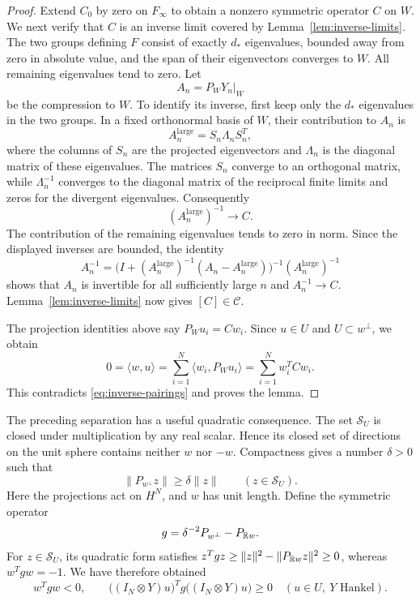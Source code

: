 \begin{proof}
Extend $C_0$ by zero on $F_\infty$ to obtain a nonzero symmetric
operator $C$ on $W$.  We next verify that $C$ is an inverse limit
covered by Lemma~\ref{lem:inverse-limits}.  The two groups defining
$F$ consist of exactly $d_*$ eigenvalues, bounded away from zero
in absolute value, and the span of their eigenvectors converges to $W$.
All remaining eigenvalues tend to zero.  Let
\[
 A_n=P_WY_n\big|_W
\]
be the compression to $W$.  To identify its inverse, first keep only
the $d_*$ eigenvalues in the two groups.  In a fixed orthonormal
basis of $W$, their contribution to $A_n$ is
\[
 A_n^{\mathrm{large}}=S_n\Lambda_nS_n^T,
\]
where the columns of $S_n$ are the projected eigenvectors and
$\Lambda_n$ is the diagonal matrix of these eigenvalues.
The matrices $S_n$ converge to an orthogonal matrix, while
$\Lambda_n^{-1}$ converges to the diagonal matrix of the
reciprocal finite limits and zeros for the divergent eigenvalues.
Consequently
\[
 (A_n^{\mathrm{large}})^{-1}\longrightarrow C.
\]
The contribution of the remaining eigenvalues tends to zero in
norm.  Since the displayed inverses are bounded, the identity
\[
 A_n^{-1}
 =\bigl(I+(A_n^{\mathrm{large}})^{-1}
                  (A_n-A_n^{\mathrm{large}})\bigr)^{-1}
    (A_n^{\mathrm{large}})^{-1}
\]
shows that $A_n$ is invertible for all sufficiently large $n$ and
$A_n^{-1}\to C$.  Lemma~\ref{lem:inverse-limits} now gives
$[C]\in\mathcal C$.

The projection identities above say $P_Wu_i=Cw_i$.  Since $u\in U$
and $U\subset w^\perp$, we obtain
\[
 0=\langle w,u\rangle
   =\sum_{i=1}^N\langle w_i,P_Wu_i\rangle
   =\sum_{i=1}^N w_i^TCw_i.
\]
This contradicts \eqref{eq:inverse-pairings} and proves the lemma.
\end{proof}

The preceding separation has a useful quadratic consequence.  The
set $\mathcal S_U$ is closed under multiplication by any real
scalar.  Hence its closed set of directions on the unit sphere
contains neither $w$ nor $-w$.  Compactness gives a number
$\delta>0$ such that
\[
 \|P_{w^\perp}z\|\ge\delta\|z\|
 \qquad(z\in\mathcal S_U).
\]
Here the projections act on $H^N$, and $w$ has unit length.  Define
the symmetric operator
\[
 g=\delta^{-2}P_{w^\perp}-P_{\mathbb R w}.
\]
For $z\in\mathcal S_U$, its quadratic form satisfies
$z^Tgz\ge\|z\|^2-\|P_{\mathbb R w}z\|^2\ge0$, whereas $w^Tgw=-1$.
We have therefore obtained
\begin{equation}
\label{eq:g-properties}
 w^Tgw<0,\qquad
 \bigl((I_N\otimes Y)u\bigr)^T
 g\bigl((I_N\otimes Y)u\bigr)\ge0
 \quad(u\in U,\ Y\text{ Hankel}).
\end{equation}

